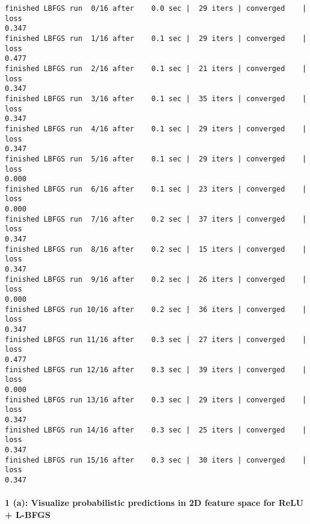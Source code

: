 \documentclass[11pt]{article}
\begin{document}
    \begin{Verbatim}[commandchars=\\\{\}]
finished LBFGS run  0/16 after    0.0 sec |  29 iters | converged    | loss
0.347
finished LBFGS run  1/16 after    0.1 sec |  29 iters | converged    | loss
0.477
finished LBFGS run  2/16 after    0.1 sec |  21 iters | converged    | loss
0.347
finished LBFGS run  3/16 after    0.1 sec |  35 iters | converged    | loss
0.347
finished LBFGS run  4/16 after    0.1 sec |  29 iters | converged    | loss
0.347
finished LBFGS run  5/16 after    0.1 sec |  29 iters | converged    | loss
0.000
finished LBFGS run  6/16 after    0.1 sec |  23 iters | converged    | loss
0.000
finished LBFGS run  7/16 after    0.2 sec |  37 iters | converged    | loss
0.347
finished LBFGS run  8/16 after    0.2 sec |  15 iters | converged    | loss
0.347
finished LBFGS run  9/16 after    0.2 sec |  26 iters | converged    | loss
0.000
finished LBFGS run 10/16 after    0.2 sec |  36 iters | converged    | loss
0.347
finished LBFGS run 11/16 after    0.3 sec |  27 iters | converged    | loss
0.477
finished LBFGS run 12/16 after    0.3 sec |  39 iters | converged    | loss
0.000
finished LBFGS run 13/16 after    0.3 sec |  29 iters | converged    | loss
0.347
finished LBFGS run 14/16 after    0.3 sec |  25 iters | converged    | loss
0.347
finished LBFGS run 15/16 after    0.3 sec |  30 iters | converged    | loss
0.347
    \end{Verbatim}

    \hypertarget{a-visualize-probabilistic-predictions-in-2d-feature-space-for-relu-l-bfgs}{%
\paragraph{1 (a): Visualize probabilistic predictions in 2D feature
space for ReLU +
L-BFGS}\label{a-visualize-probabilistic-predictions-in-2d-feature-space-for-relu-l-bfgs}}
\end{document}
